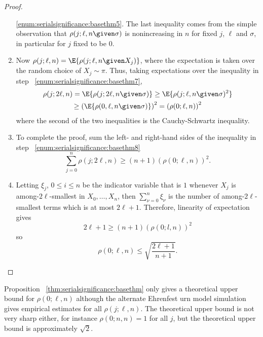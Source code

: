 \documentclass[12pt]{article}
\begin{document}
\begin{proof}
\begin{enumerate}
            \ref{enum:serialsignificance:basethm5}.  The last inequality
            comes from the simple observation that \( \rho(j; \ell, n
            \given \sigma) \) is nonincreasing in \( n \) for fixed \( j
            \), \( \ell \) and \( \sigma \), in particular for \( j \)
            fixed to be \( 0 \).
        \item
            \label{enum:serialsignificance:basethm8} Now \( \rho(j;\ell,n)
            = \E{\rho(j; \ell, n \given X_j)} \), where the expectation
            is taken over the random choice of \( X_j \sim \pi \). Thus,
            taking expectations over the inequality in step~%
            \ref{enum:serialsignificance:basethm7},
            \begin{multline}
                \rho(j; 2\ell, n) = \E{\rho(j; 2\ell, n \given \sigma)}
                \ge \E{\rho(j; \ell, n \given \sigma)^2} \\
                \ge \left( \E{\rho(0, \ell, n \given \sigma)}\right)^2 =
                \left( \rho(0; \ell, n) \right)^2
            \end{multline}
            where the second of the two inequalities is the
            Cauchy-Schwartz inequality.
        \item
            To complete the proof, sum the left- and right-hand sides of
            the inequality in step~%
            \ref{enum:serialsignificance:basethm8}
            \[
                \sum\limits_{j=0}^n \rho(j; 2\ell, n) \ge (n+1) (\rho(0;
                \ell, n))^2.
            \]
        \item
            Letting \( \xi_j \), \( 0 \le i \le n \) be the indicator
            variable that is \( 1 \) whenever \( X_j \) is among-\( 2\ell
            \)-smallest in \( X_0, \dots , X_n \), then \( \sum_{\nu=0}^n
            \xi_{\nu} \) is the number of among-\( 2\ell \)-smallest
            terms which is at most \( 2\ell + 1 \).  Therefore,
            linearity of expectation gives
            \[
                2\ell + 1 \ge (n + 1)(\rho(0; l,n) )^2
            \] so
            \[
                \rho(0; \ell, n) \le \sqrt{ \frac{2\ell + 1}{n+1}}.
            \]
    \end{enumerate}
\end{proof}

\begin{remark}
    Proposition~%
    \ref{thm:serialsignificance:basethm} only gives a theoretical upper
    bound for \( \rho(0; \ell, n) \) although the alternate Ehrenfest
    urn model simulation gives empirical estimates for all \( \rho(j;
    \ell, n) \).  The theoretical upper bound is not very sharp either,
    for instance \( \rho(0; n, n) = 1 \) for all \( j \), but the
    theoretical upper bound is approximately \( \sqrt{2} \).

\end{remark}
\end{document}
